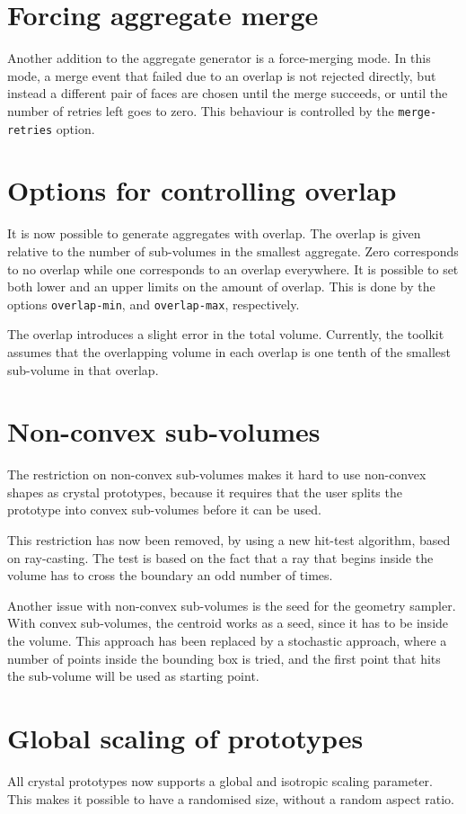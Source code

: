 \documentclass[a4paper,10pt]{scrartcl}
\begin{document}
\section{Forcing aggregate merge}
Another addition to the aggregate generator is a force-merging mode. In this mode, a merge event that failed due to an overlap is not rejected directly, but instead a different pair of faces are chosen until the merge succeeds, or until the number of retries left goes to zero. This behaviour is controlled by the \texttt{merge-retries} option.

\section{Options for controlling overlap}
It is now possible to generate aggregates with overlap. The overlap is given relative to the number of sub-volumes in the smallest aggregate. Zero corresponds to no overlap while one corresponds to an overlap everywhere. It is possible to set both lower and an upper limits on the amount of overlap. This is done by the options \texttt{overlap-min}, and \texttt{overlap-max}, respectively.

The overlap introduces a slight error in the total volume. Currently, the toolkit assumes that the overlapping volume in each overlap is one tenth of the smallest sub-volume in that overlap.

\section{Non-convex sub-volumes}
The restriction on non-convex sub-volumes makes it hard to use non-convex shapes as crystal prototypes, because it requires that the user splits the prototype into convex sub-volumes before it can be used.

This restriction has now been removed, by using a new hit-test algorithm, based on ray-casting. The test is based on the fact that a ray that begins inside the volume has to cross the boundary an odd number of times.

Another issue with non-convex sub-volumes is the seed for the geometry sampler. With convex sub-volumes, the centroid works as a seed, since it has to be inside the volume. This approach has been replaced by a stochastic approach, where a number of points inside the bounding box is tried, and the first point that hits the sub-volume will be used as starting point.

\section{Global scaling of prototypes}
All crystal prototypes now supports a global and isotropic scaling parameter. This makes it possible to have a randomised size, without a random aspect ratio.
\end{document}
